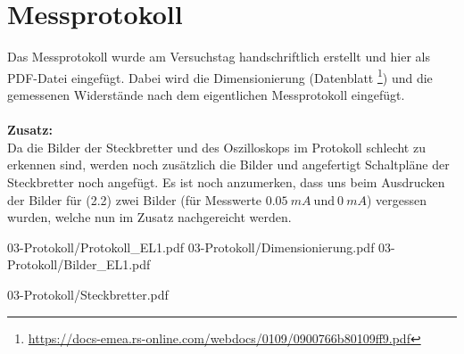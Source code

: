 

\def\skalierung{0.65}

\chapter{Messprotokoll}
\label{chap:protokoll}

Das Messprotokoll wurde am Versuchstag handschriftlich erstellt und hier als
PDF-Datei eingefügt. Dabei wird die Dimensionierung (Datenblatt \footnote{\url{https://docs-emea.rs-online.com/webdocs/0109/0900766b80109ff9.pdf}}) und die gemessenen Widerstände nach dem eigentlichen Messprotokoll eingefügt.\\\\
\textbf{Zusatz:}\\
Da die Bilder der Steckbretter und des Oszilloskops im Protokoll schlecht zu erkennen sind, werden noch zusätzlich die Bilder und angefertigt Schaltpläne der Steckbretter noch angefügt. Es ist noch anzumerken, dass uns beim Ausdrucken der Bilder für (2.2) zwei Bilder (für Messwerte $0.05~mA~\text{und}~0~mA$) vergessen wurden, welche nun im Zusatz nachgereicht werden.

%

{03-Protokoll/Protokoll_EL1.pdf}
           {03-Protokoll/Dimensionierung.pdf}
           {03-Protokoll/Bilder_EL1.pdf}

{03-Protokoll/Steckbretter.pdf}
